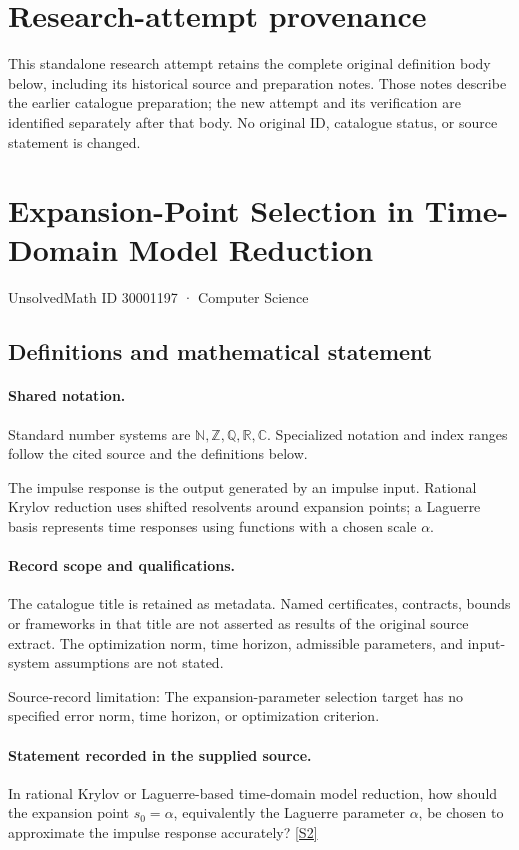 \documentclass[11pt]{article}
\begin{document}
\section*{Research-attempt provenance}
This standalone research attempt retains the complete original definition body below,
including its historical source and preparation notes. Those notes describe the
earlier catalogue preparation; the new attempt and its verification are identified
separately after that body. No original ID, catalogue status, or source statement is changed.

\section{Expansion-Point Selection in Time-Domain Model Reduction}\label{30001197}
{\small UnsolvedMath ID 30001197 · Computer Science}
\subsection{Definitions and mathematical statement}

\paragraph{Shared notation.}Standard number systems are $\mathbb N,\mathbb Z,\mathbb Q,\mathbb R,\mathbb C$. Specialized notation and index ranges follow the cited source and the definitions below.


The impulse response is the output generated by an impulse input. Rational Krylov reduction uses shifted resolvents around expansion points; a Laguerre basis represents time responses using functions with a chosen scale $\alpha$.
\paragraph{Record scope and qualifications.}
The catalogue title is retained as metadata. Named certificates, contracts, bounds or frameworks in that title are not asserted as results of the original source extract.
The optimization norm, time horizon, admissible parameters, and input-system assumptions are not stated.

Source-record limitation: The expansion-parameter selection target has no specified error norm, time horizon, or optimization criterion.
\paragraph{Statement recorded in the supplied source.}
In rational Krylov or Laguerre-based time-domain model reduction, how should the expansion point $s_0=\alpha$, equivalently the Laguerre parameter $\alpha$, be chosen to approximate the impulse response accurately? \href{https://doi.org/10.4171/owr/2009/11}{[S2]}
\end{document}
